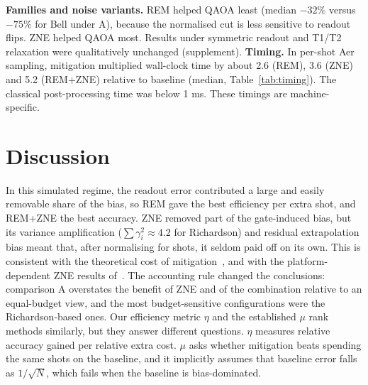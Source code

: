 \documentclass[11pt]{article}
\begin{document}
\textbf{Families and noise variants.}  REM helped QAOA least (median $-32\%$ versus $-75\%$ for Bell under A), because the normalised cut is
less sensitive to readout flips. ZNE helped QAOA most. Results under symmetric readout and T1/T2 relaxation were qualitatively unchanged (supplement).
\textbf{Timing.} In per-shot Aer sampling, mitigation multiplied wall-clock time by about 2.6 (REM), 3.6 (ZNE) and 5.2 (REM+ZNE) relative to baseline
(median, Table~\ref{tab:timing}). The classical post-processing time was below 1 ms. These timings are machine-specific.


\section{Discussion}
In this simulated regime, the readout error contributed a large and easily removable share of the bias, so REM gave the best
efficiency per extra shot, and REM+ZNE the best accuracy. ZNE removed part of the gate-induced bias, but its variance amplification
($\sum\gamma_i^2\approx4.2$ for Richardson) and residual extrapolation bias meant that, after normalising for shots, it seldom paid off on its own.
This is consistent with the theoretical cost of mitigation~\cite{takagi2022,cai2023review}, and with the platform-dependent ZNE results of~\cite{russo2023}.
The accounting rule changed the conclusions: comparison A overstates the benefit of ZNE and of the combination relative to an
equal-budget view, and the most budget-sensitive configurations were the Richardson-based ones. Our efficiency metric $\eta$ and the established $\mu$
rank methods similarly, but they answer different questions. $\eta$ measures relative accuracy gained per relative extra cost. $\mu$ asks whether mitigation beats
spending the same shots on the baseline, and it implicitly assumes that baseline error falls as $1/\sqrt N$, which fails when the baseline is bias-dominated.
\end{document}

